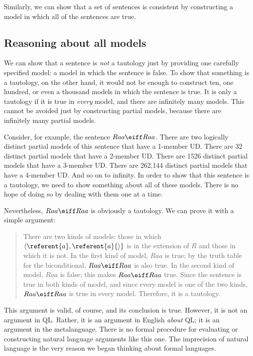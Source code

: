 Similarly, we can show that a set of sentences is consistent by constructing a model in which all of the sentences are true.



\subsection{Reasoning about all models}
We can show that a sentence is \emph{not} a tautology just by providing one carefully specified model: a model in which the sentence is false. To show that something is a tautology, on the other hand, it would not be enough to construct ten, one hundred, or even a thousand models in which the sentence is true. It is only a tautology if it is true in \emph{every} model, and there are infinitely many models. This cannot be avoided just by constructing partial models, because there are infinitely many partial models.

Consider, for example, the sentence $Raa\eiff Raa$. There are two logically distinct partial models of this sentence that have a 1-member UD. There are 32 distinct partial models that have a 2-member UD. There are 1526 distinct partial models that have a 3-member UD. There are 262,144 distinct partial models that have a 4-member UD. And so on to infinity. In order to show that this sentence is a tautology, we need to show something about all of these models. There is no hope of doing so by dealing with them one at a time.

Nevertheless, $Raa\eiff Raa$ is obviously a tautology. We can prove it with a simple argument:
\begin{quote}
\label{allmodels1}
There are two kinds of models: those in which ${\langle}\referent{a},\referent{a}{\rangle}$ is in the extension of $R$ and those in which it is not. In the first kind of model, $Raa$ is true; by the truth table for the biconditional, $Raa\eiff Raa$ is also true. In the second kind of model, $Raa$ is false; this makes $Raa\eiff Raa$ true. Since the sentence is true in both kinds of model, and since every model is one of the two kinds, $Raa\eiff Raa$ is true in every model. Therefore, it is a tautology.
\end{quote}
This argument is valid, of course, and its conclusion is true. However, it is not an argument in QL. Rather, it is an argument in English \emph{about} QL; it is an argument in the metalanguage. There is no formal procedure for evaluating or constructing natural language arguments like this one. The imprecision of natural language is the very reason we began thinking about formal languages.

